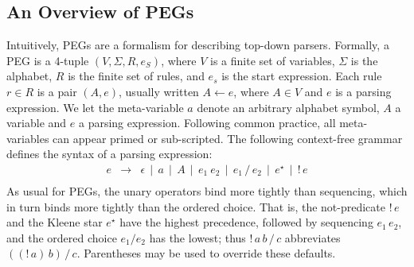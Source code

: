 \documentclass[preprint,12pt]{elsarticle}
\theoremstyle{definition}
\begin{document}
\subsection{An Overview of PEGs}

Intuitively, PEGs are a formalism for describing top-down parsers.
Formally, a PEG is a 4-tuple $(V,\Sigma,R,e_S)$, where $V$ is a
finite set of variables, $\Sigma$ is the alphabet, $R$ is the finite
set of rules, and $e_s$ is the start expression. Each rule $r \in R$ is a
pair $(A,e)$, usually written $A \leftarrow e$, where $A \in V$ and $e$
is a parsing expression. We let the meta-variable $a$ denote an
arbitrary alphabet symbol, $A$ a variable and $e$ a parsing expression.
Following common practice, all meta-variables can appear primed or
sub-scripted. The following context-free grammar defines
the syntax of a parsing expression:
\[
\begin{array}{lcl}
e & \to  & \epsilon \,\mid\, a \,\mid\, A\,\mid\,e_1\:e_2\,
\mid\,e_1\,/\,e_2\,\mid\,e^\star\,\mid\,!\,e\\
\end{array}
\]
As usual for PEGs, the unary operators bind more tightly than sequencing, which
in turn binds more tightly than the ordered choice. That is, the not-predicate
$!\,e$ and the Kleene star $e^\star$ have the highest precedence, followed by
sequencing $e_1\,e_2$, and the ordered choice $e_1 / e_2$ has the lowest; thus
$!\,a\,b\,/\,c$ abbreviates $((!\,a)\,b)\,/\,c$. Parentheses may be used to
override these defaults.
\end{document}
